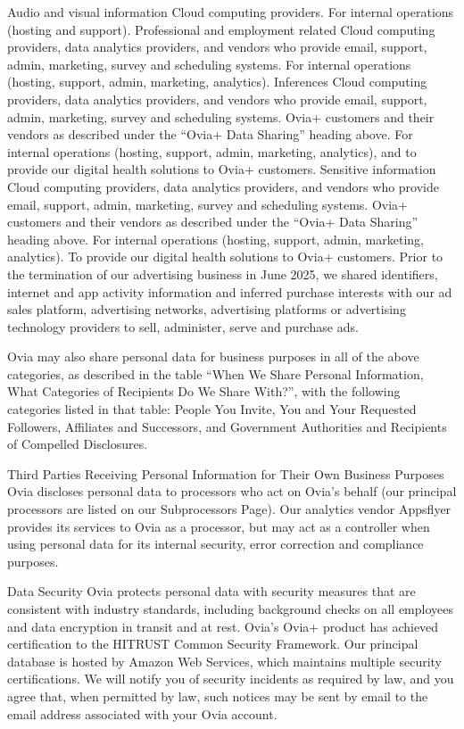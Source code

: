 Audio and visual information	Cloud computing providers.	For internal operations (hosting and support).
Professional and employment related	Cloud computing providers, data analytics providers, and vendors who provide email, support, admin, marketing, survey and scheduling systems.	For internal operations (hosting, support, admin, marketing, analytics).
Inferences	Cloud computing providers, data analytics providers, and vendors who provide email, support, admin, marketing, survey and scheduling systems.
Ovia+ customers and their vendors as described under the “Ovia+ Data Sharing” heading above.
For internal operations (hosting, support, admin, marketing, analytics), and to provide our digital health solutions to Ovia+ customers.
Sensitive information	Cloud computing providers, data analytics providers, and vendors who provide email, support, admin, marketing, survey and scheduling systems.
Ovia+ customers and their vendors as described under the “Ovia+ Data Sharing” heading above.	For internal operations (hosting, support, admin, marketing, analytics).
To provide our digital health solutions to Ovia+ customers.
Prior to the termination of our advertising business in June 2025, we shared identifiers, internet and app activity information and inferred purchase interests with our ad sales platform, advertising networks, advertising platforms or advertising technology providers to sell, administer, serve and purchase ads.


Ovia may also share personal data for business purposes in all of the above categories, as described in the table “When We Share Personal Information, What Categories of Recipients Do We Share With?”, with the following categories listed in that table: People You Invite, You and Your Requested Followers, Affiliates and Successors, and Government Authorities and Recipients of Compelled Disclosures.

Third Parties Receiving Personal Information for Their Own Business Purposes
Ovia discloses personal data to processors who act on Ovia’s behalf (our principal processors are listed on our Subprocessors Page). Our analytics vendor Appsflyer provides its services to Ovia as a processor, but may act as a controller when using personal data for its internal security, error correction and compliance purposes.

Data Security
Ovia protects personal data with security measures that are consistent with industry standards, including background checks on all employees and data encryption in transit and at rest. Ovia’s Ovia+ product has achieved certification to the HITRUST Common Security Framework. Our principal database is hosted by Amazon Web Services, which maintains multiple security certifications. We will notify you of security incidents as required by law, and you agree that, when permitted by law, such notices may be sent by email to the email address associated with your Ovia account.

